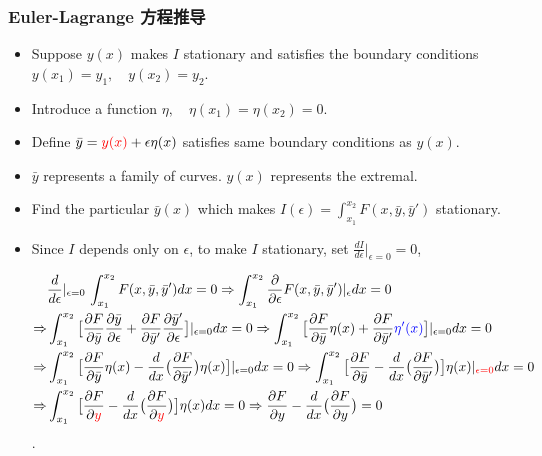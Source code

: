 \documentclass[UTF8, aspectratio=169, 10pt]{ctexbeamer}
\begin{document}
\begin{frame}
  \frametitle{Euler-Lagrange 方程推导}
  \begin{itemize}
  \item Suppose $y(x)$ makes $I$ stationary and satisfies the boundary
    conditions $y(x_1) = y_1, \quad y(x_2) = y_2$.
  \item Introduce a function $\eta, \quad \eta (x_1) = \eta (x_2) = 0$.
  \item Define $\bar{y} = \textcolor{red} {y(x)} + \epsilon \eta(x)$ satisfies same boundary
    conditions as $y(x)$.
  \item $\bar{y}$ represents a family of curves. $ y(x) $ represents the extremal.
  \item Find the particular $\bar{y} (x)$ which makes $I( \epsilon ) =
    \int_{x_1}^{x_2} F( x, \bar{y}, \bar{y}' )$ stationary.
  \item Since $I$ depends only on $\epsilon$, to make $I$ stationary, set
    $\frac{dI}{d \epsilon} |_{\epsilon = 0} = 0$,

    \begin{align}
      \begin{split}
        & \frac{d}{d \epsilon} |_{\epsilon = 0} \, \int_{x_1}^{x_2} F(x,
        \bar{y}, \bar{y}' ) dx = 0 \Rightarrow \int_{x_1}^{x_2}
        \frac{\partial}{\partial
          \epsilon} F( x, \bar{y}, \bar{y}' ) |_{\epsilon} dx = 0 \\
        \Rightarrow & \int_{x_1}^{x_2} \big [ \frac{ \partial F }{ \partial
          \bar{y} } \frac{ \partial \bar{y} }{ \partial \epsilon } + \frac{
          \partial F }{ \partial \bar{y}' } \frac{ \partial \bar{y}' }{ \partial
          \epsilon } \big ] |_{\epsilon=0} dx = 0
        \Rightarrow  \int_{x_1}^{x_2} \big [ \frac{ \partial F }{ \partial
          \bar{y} } \eta (x) + \frac{
          \partial F }{ \partial \bar{y}' } \textcolor {blue} {\eta'(x)} \big ] |_{\epsilon=0} dx =
        0 \\
        \Rightarrow & \int_{x_1}^{x_2} \big [ \frac{ \partial F }{ \partial
          \bar{y} } \eta (x) - \frac{d}{dx} \big ( \frac{
          \partial F }{ \partial \bar{y}' } \big ) \eta(x) \big ] |_{\epsilon=0} dx =
        0
        \Rightarrow  \int_{x_1}^{x_2} \big [ \frac{ \partial F }{ \partial
          \bar{y} }  - \frac{d}{dx} \big ( \frac{
          \partial F }{ \partial \bar{y}' } \big )  \big ] \eta(x) |_{\textcolor
          {red} {\epsilon=0} } dx =
        0  \\
        \Rightarrow & \int_{x_1}^{x_2} \big [ \frac{ \partial F }{ \partial
          \textcolor {red} {y} }  - \frac{d}{dx} \big ( \frac{
          \partial F }{ \partial \textcolor {red} {y} } \big )  \big ] \eta(x)  dx =
        0
        \Rightarrow \frac{ \partial F }{ \partial
          {y} }  - \frac{d}{dx} \big ( \frac{
          \partial F }{ \partial  {y} } \big )  = 0
      \end{split}
    \end{align}.
    
  \end{itemize}
\end{frame}
\end{document}
